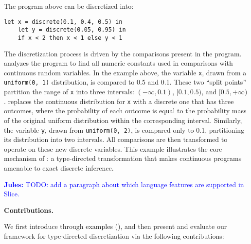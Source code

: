 \documentclass[acmsmall,screen,dvipsnames,x11names,nonacm,anonymous,review]{acmart}
\renewcommand{\paragraph}[1]{\vspace{1em}\noindent\textbf{#1}\ }
\newcommand{\jules}[1]{\textcolor{blue}{\textbf{Jules:} #1}}
\begin{document}
\noindent The program above can be discretized into:

\begin{lstlisting}[aboveskip=1em,belowskip=1em]
    let x = discrete(0.1, 0.4, 0.5) in
    let y = discrete(0.05, 0.95) in
    if x < 2 then x < 1 else y < 1
\end{lstlisting}

The discretization process is driven by the comparisons present in the program. \Slice{} analyzes the program to find all numeric constants used in comparisons with continuous random variables. In the example above, the variable \texttt{x}, drawn from a \texttt{uniform(0, 1)} distribution, is compared to 0.5 and 0.1. These two ``split points'' partition the range of \texttt{x} into three intervals: $(-\infty, 0.1)$, $[0.1, 0.5)$, and $[0.5, +\infty)$. \Slice{} replaces the continuous distribution for \texttt{x} with a discrete one that has three outcomes, where the probability of each outcome is equal to the probability mass of the original uniform distribution within the corresponding interval. Similarly, the variable \texttt{y}, drawn from \texttt{uniform(0, 2)}, is compared only to 0.1, partitioning its distribution into two intervals. All comparisons are then transformed to operate on these new discrete variables. This example illustrates the core mechanism of \Slice{}: a type-directed transformation that makes continuous programs amenable to exact discrete inference.

\jules{TODO: add a paragraph about which language features are supported in Slice.}

\paragraph{Contributions.}

We first introduce \Slice{} through examples (), and then present and evaluate our framework for type-directed discretization via the following contributions:
\end{document}

